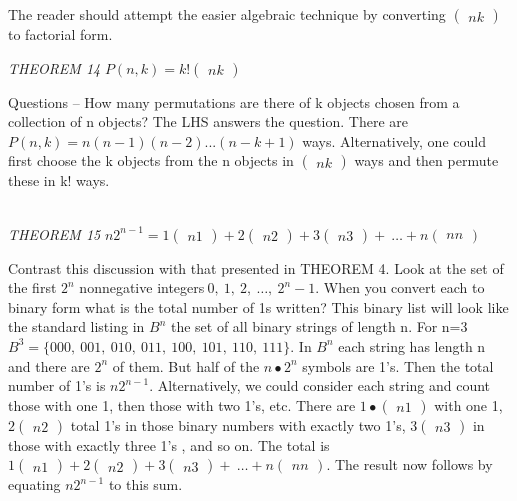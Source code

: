 \documentclass[10pt,letter]{article}
\begin{document}
The reader should attempt the easier algebraic technique by converting
\(\begin{pmatrix}
n
k
\end{pmatrix}
\) to factorial form.

\emph{THEOREM 14} \(P\left( n,k \right) = k!
\begin{pmatrix}
n
k
\end{pmatrix}
\)

Questions -- How many permutations are there of k objects chosen from a
collection of n objects? The LHS answers the question. There are
\(P\left( n,k \right) = n\left( n - 1 \right)\left( n - 2 \right)...(n - k + 1)\)
ways. Alternatively, one could first choose the k objects from the n
objects in \(\begin{pmatrix}
n
k
\end{pmatrix}
\) ways and then permute these in k! ways.

\emph{\\
THEOREM 15} \(n2^{n - 1} = 1
\begin{pmatrix}
n
1
\end{pmatrix}
 + 2
\begin{pmatrix}
n
2
\end{pmatrix}
 + 3
\begin{pmatrix}
n
3
\end{pmatrix}
 + \ \ldots + n
\begin{pmatrix}
n
n
\end{pmatrix}
\)

Contrast this discussion with that presented in THEOREM 4. Look at the
set of the first \(2^{n}\) nonnegative
integers\(\ 0,\ 1,\ 2,\ \ldots,\ 2^{n} - 1\). When you convert each to
binary form what is the total number of 1s written? This binary list
will look like the standard listing in \(B^{n}\) the set of all binary
strings of length n. For n=3
\(B^{3} = \{ 000,\ 001,\ 010,\ 011,\ 100,\ 101,\ 110,\ 111\}\). In
\(B^{n}\) each string has length n and there are \(2^{n}\) of them. But
half of the \(n \bullet 2^{n}\) symbols are 1's. Then the total number
of 1's is \(n2^{n - 1}\). Alternatively, we could consider each string
and count those with one 1, then those with two 1's, etc. There are
\(1 \bullet
\begin{pmatrix}
n
1
\end{pmatrix}
\) with one 1, \(2
\begin{pmatrix}
n
2
\end{pmatrix}
\) total 1's in those binary numbers with exactly two 1's,
\(3
\begin{pmatrix}
n
3
\end{pmatrix}
\) in those with exactly three 1's , and so on. The total
is \(1
\begin{pmatrix}
n
1
\end{pmatrix}
 + 2
\begin{pmatrix}
n
2
\end{pmatrix}
 + 3
\begin{pmatrix}
n
3
\end{pmatrix}
 + \ \ldots + n
\begin{pmatrix}
n
n
\end{pmatrix}
\text{.\ }\)The result now follows by equating
\(n2^{n - 1}\) to this sum.
\end{document}
